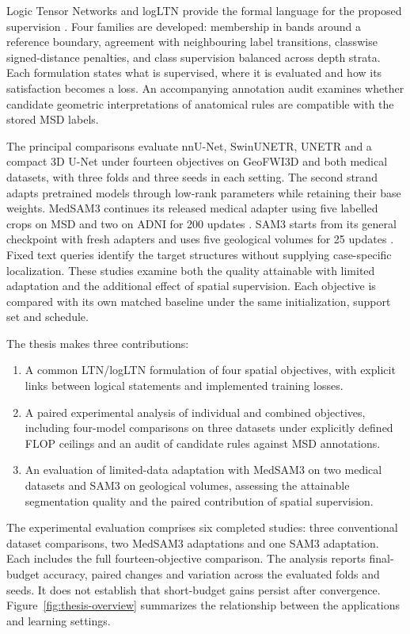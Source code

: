 \documentclass[12pt,a4paper]{article}
\begin{document}
Logic Tensor Networks and logLTN provide the formal language for the
proposed supervision \cite{badreddine2022logic,badreddine2023logltn}.
Four families are developed: membership in bands around a reference
boundary, agreement with neighbouring label transitions, classwise
signed-distance penalties, and class supervision balanced across depth
strata. Each formulation states what is supervised, where it is evaluated
and how its satisfaction becomes a loss. An accompanying annotation audit
examines whether candidate geometric interpretations of anatomical rules
are compatible with the stored MSD labels.

The principal comparisons evaluate nnU-Net, SwinUNETR, UNETR and a compact
3D U-Net under fourteen objectives on GeoFWI3D and both medical datasets,
with three folds and three seeds in each setting. The second strand
adapts pretrained models through low-rank parameters while retaining
their base weights. MedSAM3 continues its released medical adapter using
five labelled crops on MSD and two on ADNI for 200 updates
\cite{liu2025medsam3}. SAM3 starts from its general checkpoint with fresh
adapters and uses five geological volumes for 25 updates
\cite{carion2025sam3}. Fixed text queries identify the target structures
without supplying case-specific localization. These studies examine both
the quality attainable with limited adaptation and the additional effect
of spatial supervision. Each objective is compared with its own matched
baseline under the same initialization, support set and schedule.

The thesis makes three contributions:
\begin{enumerate}
\item A common LTN/logLTN formulation of four spatial objectives, with
explicit links between logical statements and implemented training losses.
\item A paired experimental analysis of individual and combined objectives,
including four-model comparisons on three datasets under explicitly
defined FLOP ceilings and an audit of candidate rules against MSD annotations.
\item An evaluation of limited-data adaptation with MedSAM3 on two medical
datasets and SAM3 on geological volumes, assessing the attainable
segmentation quality and the paired contribution of spatial supervision.
\end{enumerate}

The experimental evaluation comprises six completed studies: three conventional
dataset comparisons, two MedSAM3 adaptations and one SAM3 adaptation.
Each includes the full fourteen-objective comparison. The analysis
reports final-budget accuracy, paired changes and variation across the
evaluated folds and seeds. It does not establish that short-budget gains
persist after convergence. Figure~\ref{fig:thesis-overview} summarizes
the relationship between the applications and learning settings.
\end{document}
